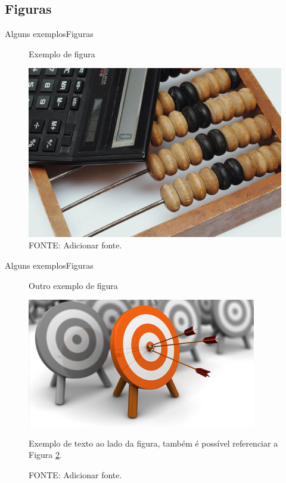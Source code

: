 \documentclass[aspectratio=169]{beamer}
\begin{document}
\subsection{Figuras}
\begin{frame}{Alguns exemplos}{Figuras}
	
	 \begin{figure}[h!]
		\centering
		\caption{Exemplo de figura}
		\label{f:figura-1}
		\includegraphics[scale=0.15]{figura-1.jpg}
		\parbox{10.5cm}{\caption*{\tiny{FONTE: Adicionar fonte.}}}
	\end{figure}
	
\end{frame}



\begin{frame}{Alguns exemplos}{Figuras}
	
	\begin{figure}[h!]
		\centering
		\begin{minipage}{0.5\textwidth}
			\centering
			\caption{Outro exemplo de figura}
			\label{f:figura-2}
			\includegraphics[scale=0.5]{figura-2.jpg}
			\caption*{\tiny{FONTE: Adicionar fonte.}}
		\end{minipage}
		\hspace{15pt}
		\begin{minipage}{0.40\textwidth}
			\centering
			\justifying Exemplo de texto ao lado da figura, também é possível referenciar a Figura \ref{f:figura-2}.
		\end{minipage}
	\end{figure}
	
\end{frame}
\end{document}
